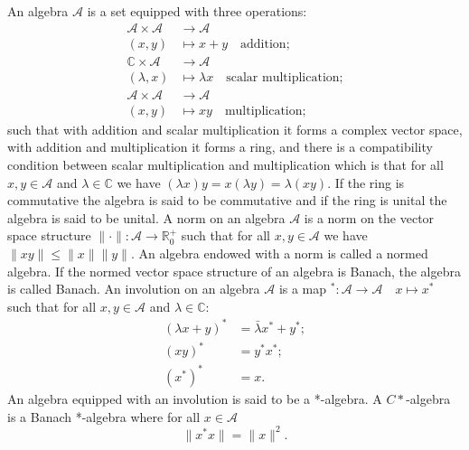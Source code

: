 \begin{definition}
An algebra $\mathcal{A}$ is a set equipped with three operations:
\begin{align}
 \mathcal{A} \times \mathcal{A} & \rightarrow  \mathcal{A} \\
 (x,y) & \mapsto  x+y \quad\text{addition;} \nonumber \\
 \mathbb{C} \times \mathcal{A} & \rightarrow \mathcal{A} \\
 (\lambda,x) & \mapsto \lambda x \quad\text{scalar multiplication;} \nonumber \\
 \mathcal{A} \times \mathcal{A} & \rightarrow \mathcal{A} \\
 (x, y) & \mapsto xy \quad\text{multiplication;} \nonumber
\end{align}
such that with addition and scalar multiplication it forms a complex vector space, with addition and multiplication it forms a ring, and there is a compatibility condition between scalar multiplication and multiplication which is that for all $x,y\in\mathcal{A}$ and $\lambda\in\mathbb{C}$ we have $(\lambda x)y=x(\lambda y) = \lambda (xy)$. If the ring is commutative the algebra is said to be commutative and if the ring is unital the algebra is said to be unital. A norm on an algebra $\mathcal{A}$ is a norm on the vector space structure $\|\cdot\|:\mathcal{A} \rightarrow \mathbb{R}^{+}_0 $ such that for all $x,y\in\mathcal{A}$ we have $\|xy\|\leq\|x\|\|y\|$. An algebra endowed with a norm is called a normed algebra. If the normed vector space structure of an algebra is Banach, the algebra is called Banach. An involution on an algebra $\mathcal{A}$ is a map $^*:\mathcal{A}  \rightarrow \mathcal{A} \quad x \mapsto x^*$ such that for all $x,y\in\mathcal{A}$ and $\lambda\in\mathbb{C}$:
\begin{align}
(\lambda x + y)^*&=\bar{\lambda}x^* + y^*; \\
(xy)^*&=y^*x^*;\\
(x^*)^*&=x.
\end{align}
An algebra equipped with an involution is said to be a *-algebra. A $C*$-algebra is a Banach *-algebra where for all $x\in\mathcal{A}$ 
\begin{equation}
\|x^*x\|=\|x\|^2.
\end{equation}
\end{definition}

